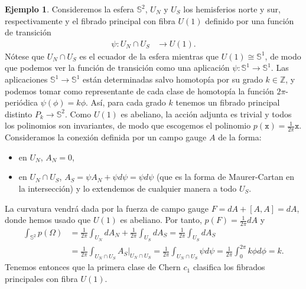 \documentclass[12pt,a4paper]{article}
\theoremstyle{definition} \newtheorem{defn}[thm]{Definición}
\theoremstyle{definition} \newtheorem{ejemplo}[thm]{Ejemplo}
\theoremstyle{definition} \newtheorem{ejercicio}[thm]{Ejercicio}
\theoremstyle{remark} \newtheorem*{obs}{Observación}
\def\xx{\mathtt{x}}
\def\ZZ{\mathbb{Z}}
\def\SF{\mathbb{S}}
\begin{document}
	   \begin{ejemplo}
	     Consideremos la esfera $\SF^2$, $U_N$ y $U_S$ los hemisferios norte y sur, respectivamente y el fibrado principal con fibra $U(1)$ definido por una función de transición
	     \begin{align*}
	       \psi :U_N\cap U_S&\longrightarrow U(1) .
	       \end{align*}
	       Nótese que $U_N\cap U_S$ es el ecuador de la esfera mientras que $U(1)\cong \SF^1$, de modo que podemos ver la función de transición como una aplicación $\psi:\SF^1 \rightarrow \SF^1$. Las aplicaciones $\SF^1\rightarrow \SF^1$ están determinadas salvo homotopía por su grado $k\in \ZZ$, y podemos tomar como representante de cada clase de homotopía la función $2\pi$-periódica $\psi(\phi)= k\phi$. Así, para cada grado $k$ tenemos un fibrado principal distinto $P_k\rightarrow \SF^2$. Como $U(1)$ es abeliano, la acción adjunta es trivial y todos los polinomios son invariantes, de modo que escogemos el polinomio $p(\xx)=\frac{1}{2\pi}\xx$. Consideramos la conexión definida por un campo gauge $A$ de la forma:
	       \begin{itemize}
		 \item en $U_N$, $A_N=0$,
		 \item en $U_N\cap U_S$,  $A_S=\psi A_N + \psi d\psi=\psi d\psi$ (que es la forma de Maurer-Cartan en la intersección) y lo extendemos de cualquier manera a todo $U_S$.
	       \end{itemize}
	       La curvatura vendrá dada por la fuerza de campo gauge $F=dA+[A,A]=dA$, donde hemos usado que $U(1)$ es abeliano. Por tanto, $p(F)=\frac{1}{2\pi}dA$ y
	       \begin{align*}
		 \int_{\SF^2} p(\Omega)&=\frac{1}{2\pi} \int_{U_N}dA_N+\frac{1}{2\pi}\int_{U_S}dA_S=\frac{1}{2\pi}\int_{U_S}dA_S\\ &=\frac{1}{2\pi}\int_{U_N\cap U_S}A_S|_{U_N\cap U_S}=\frac{1}{2\pi}\int_{U_N\cap U_S}\psi d\psi= \frac{1}{2\pi} \int_0^{2\pi} k\phi d\phi = k.
	       \end{align*}
	       Tenemos entonces que la primera clase de Chern $c_1$ clasifica los fibrados principales con fibra $U(1)$.
	   \end{ejemplo}
\end{document}
